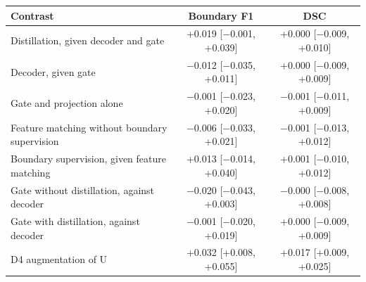 \begin{tabular}{lcc}
\toprule
Contrast & Boundary F1 & DSC \\
\midrule
Distillation, given decoder and gate & +0.019 [$-$0.001, +0.039] & +0.000 [$-$0.009, +0.010] \\
Decoder, given gate & $-$0.012 [$-$0.035, +0.011] & +0.000 [$-$0.009, +0.009] \\
Gate and projection alone & $-$0.001 [$-$0.023, +0.020] & $-$0.001 [$-$0.011, +0.009] \\
Feature matching without boundary supervision & $-$0.006 [$-$0.033, +0.021] & $-$0.001 [$-$0.013, +0.012] \\
Boundary supervision, given feature matching & +0.013 [$-$0.014, +0.040] & +0.001 [$-$0.010, +0.012] \\
Gate without distillation, against decoder & $-$0.020 [$-$0.043, +0.003] & $-$0.000 [$-$0.008, +0.008] \\
Gate with distillation, against decoder & $-$0.001 [$-$0.020, +0.019] & +0.000 [$-$0.009, +0.009] \\
D4 augmentation of U & +0.032 [+0.008, +0.055] & +0.017 [+0.009, +0.025] \\
\bottomrule
\end{tabular}
